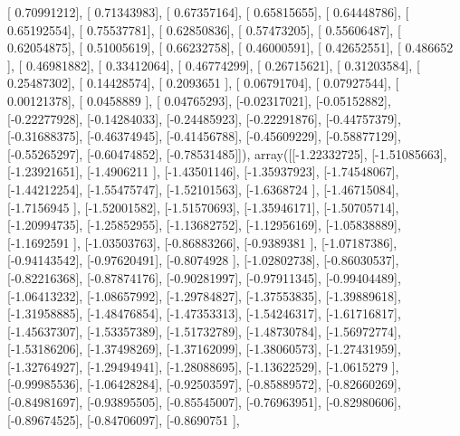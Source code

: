 \documentclass{article}
\begin{document}
       [ 0.70991212],
       [ 0.71343983],
       [ 0.67357164],
       [ 0.65815655],
       [ 0.64448786],
       [ 0.65192554],
       [ 0.75537781],
       [ 0.62850836],
       [ 0.57473205],
       [ 0.55606487],
       [ 0.62054875],
       [ 0.51005619],
       [ 0.66232758],
       [ 0.46000591],
       [ 0.42652551],
       [ 0.486652  ],
       [ 0.46981882],
       [ 0.33412064],
       [ 0.46774299],
       [ 0.26715621],
       [ 0.31203584],
       [ 0.25487302],
       [ 0.14428574],
       [ 0.2093651 ],
       [ 0.06791704],
       [ 0.07927544],
       [ 0.00121378],
       [ 0.0458889 ],
       [ 0.04765293],
       [-0.02317021],
       [-0.05152882],
       [-0.22277928],
       [-0.14284033],
       [-0.24485923],
       [-0.22291876],
       [-0.44757379],
       [-0.31688375],
       [-0.46374945],
       [-0.41456788],
       [-0.45609229],
       [-0.58877129],
       [-0.55265297],
       [-0.60474852],
       [-0.78531485]]), array([[-1.22332725],
       [-1.51085663],
       [-1.23921651],
       [-1.4906211 ],
       [-1.43501146],
       [-1.35937923],
       [-1.74548067],
       [-1.44212254],
       [-1.55475747],
       [-1.52101563],
       [-1.6368724 ],
       [-1.46715084],
       [-1.7156945 ],
       [-1.52001582],
       [-1.51570693],
       [-1.35946171],
       [-1.50705714],
       [-1.20994735],
       [-1.25852955],
       [-1.13682752],
       [-1.12956169],
       [-1.05838889],
       [-1.1692591 ],
       [-1.03503763],
       [-0.86883266],
       [-0.9389381 ],
       [-1.07187386],
       [-0.94143542],
       [-0.97620491],
       [-0.8074928 ],
       [-1.02802738],
       [-0.86030537],
       [-0.82216368],
       [-0.87874176],
       [-0.90281997],
       [-0.97911345],
       [-0.99404489],
       [-1.06413232],
       [-1.08657992],
       [-1.29784827],
       [-1.37553835],
       [-1.39889618],
       [-1.31958885],
       [-1.48476854],
       [-1.47353313],
       [-1.54246317],
       [-1.61716817],
       [-1.45637307],
       [-1.53357389],
       [-1.51732789],
       [-1.48730784],
       [-1.56972774],
       [-1.53186206],
       [-1.37498269],
       [-1.37162099],
       [-1.38060573],
       [-1.27431959],
       [-1.32764927],
       [-1.29494941],
       [-1.28088695],
       [-1.13622529],
       [-1.0615279 ],
       [-0.99985536],
       [-1.06428284],
       [-0.92503597],
       [-0.85889572],
       [-0.82660269],
       [-0.84981697],
       [-0.93895505],
       [-0.85545007],
       [-0.76963951],
       [-0.82980606],
       [-0.89674525],
       [-0.84706097],
       [-0.8690751 ],
\end{document}
